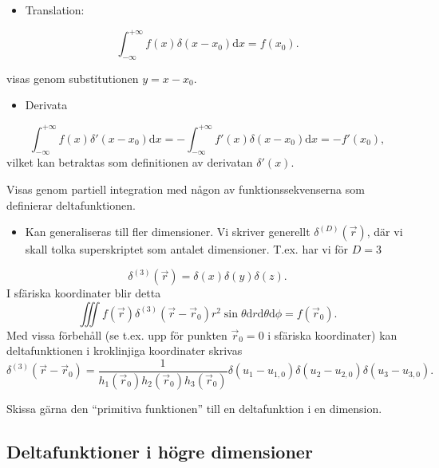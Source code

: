 \documentclass[%
oneside,                 %
final,                   %
10pt]{article}
\newenvironment{warning_mdfboxadmon}[1][]{
\begin{warning_mdfboxmdframed}[frametitle=#1]
}
{
\end{warning_mdfboxmdframed}
}
\begin{document}
\begin{itemize}
\item Translation: 
\end{itemize}

\noindent
$$
\int_{-\infty}^{+\infty} f(x) \delta(x-x_0) \mbox{d}x = f(x_0).
$$

\begin{warning_mdfboxadmon}[Kommentar]
visas genom substitutionen $y=x-x_0$.
\end{warning_mdfboxadmon} %


\begin{itemize}
\item Derivata 
\end{itemize}

\noindent
$$
\int_{-\infty}^{+\infty} f(x) \delta'(x-x_0) \mbox{d}x = -\int_{-\infty}^{+\infty} f'(x) \delta(x-x_0) \mbox{d}x = -f'(x_0),
$$
vilket kan betraktas som definitionen av derivatan $\delta'(x)$.


\begin{warning_mdfboxadmon}[Kommentar]
Visas genom partiell integration med någon av funktionssekvenserna som definierar deltafunktionen.
\end{warning_mdfboxadmon} %


\begin{itemize}
\item Kan generaliseras till fler dimensioner. Vi skriver generellt $\delta^{(D)}(\vec{r})$, där vi skall tolka superskriptet som antalet dimensioner. T.ex. har vi för $D=3$ 
\end{itemize}

\noindent
$$
\delta^{(3)}(\vec{r}) = \delta(x) \delta(y) \delta(z).
$$
I sfäriska koordinater blir detta
$$
\iiint f(\vec{r}) \delta^{(3)}(\vec{r} - \vec{r}_0) r^2 \sin\theta \mbox{d}r \mbox{d}\theta \mbox{d}\phi = f(\vec{r}_0).
$$
Med vissa förbehåll (se t.ex. upp för punkten $\vec{r}_0=0$ i sfäriska koordinater) kan deltafunktionen i kroklinjiga koordinater skrivas
$$
\delta^{(3)}(\vec{r} - \vec{r}_0) = \frac{1}{h_1(\vec{r}_0) h_2(\vec{r}_0) h_3(\vec{r}_0)} \delta(u_1-u_{1,0}) \delta(u_2-u_{2,0}) \delta(u_3-u_{3,0}).
$$


\begin{warning_mdfboxadmon}[Rita]
Skissa gärna den ``primitiva funktionen'' till en deltafunktion i en dimension.
\end{warning_mdfboxadmon} %



\subsection*{Deltafunktioner i högre dimensioner}
\end{document}
